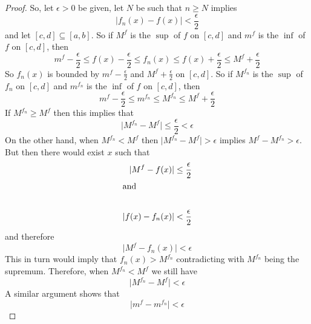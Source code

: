 \begin{enumerate}
    \begin{proof}
    So, let \( \epsilon > 0 \) be given, let \( N \) be such that \( n \geq N \) implies
    \[
    \vert f_n(x) - f(x) \vert < \frac{\epsilon}{2}
    \]
    and let \( [c,d] \subseteq [a,b] \). So if \( M^f \) is the \( \sup \) of \( f \) on \( [c,d] \) and \( m^f \) is the \( \inf \) of \( f \) on \( [c,d] \), then
    \[
    m^f - \frac{\epsilon}{2} \leq f(x) - \frac{\epsilon}{2} \leq f_n(x) \leq f(x) + \frac{\epsilon}{2} \leq M^f + \frac{\epsilon}{2}
    \]
    So \( f_n(x) \) is bounded by \( m^f - \frac{\epsilon}{2} \) and \( M^f + \frac{\epsilon}{2} \) on \( [c,d] \). So if \( M^{f_n} \) is the \( \sup \) of \( f_n \) on \( [c,d] \) and \( m^{f_n} \) is the \( \inf \) of \( f \) on \( [c,d] \), then 
    \[
    m^f - \frac{\epsilon}{2} \leq m^{f_n} \leq M^{f_n} \leq M^f + \frac{\epsilon}{2}
    \]
    If \( M^{f_n} \geq M^f \) then this implies that
    \[
        \vert M^{f_n} - M^f \vert \leq \frac{\epsilon}{2} < \epsilon
    \]
    On the other hand, when \( M^{f_n} < M^f \) then \( \vert M^{f_n} - M^f \vert > \epsilon  \) implies \( M^f - M^{f_n} > \epsilon \). But then there would exist \( x \) such that 
    \begin{align*}
        \vert M^f - f(x) \vert &\leq \frac{\epsilon}{2} \\
        \intertext{and}\\
        \vert f(x) - f_n(x) \vert &< \frac{\epsilon}{2}
    \end{align*}
    and therefore
    \[
    \vert M^f - f_n(x) \vert < \epsilon
    \]
    This in turn would imply that \( f_n(x) > M^{f_n} \) contradicting with \( M^{f_n} \) being the supremum. Therefore, when \( M^{f_n} < M^f \) we still have
    \[
    \vert M^{f_n} - M^f \vert < \epsilon
    \]
    A similar argument shows that
    \[
    \vert m^f - m^{f_n} \vert < \epsilon
    \]
    \end{proof}
    

\end{enumerate}
